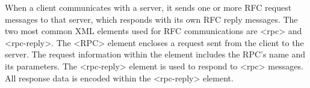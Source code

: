 When a client communicates with a server, it sends one or more RFC request messages to that server, which responds with its own RFC reply messages. The two most common XML elements used for RFC communications are <rpc> and <rpc-reply>. The <RPC> element encloses a request sent from the client to the server. The request information within the element includes the RPC's name and its parameters. The <rpc-reply> element is used to respond to <rpc> messages. All response data is encoded within the <rpc-reply> element.

